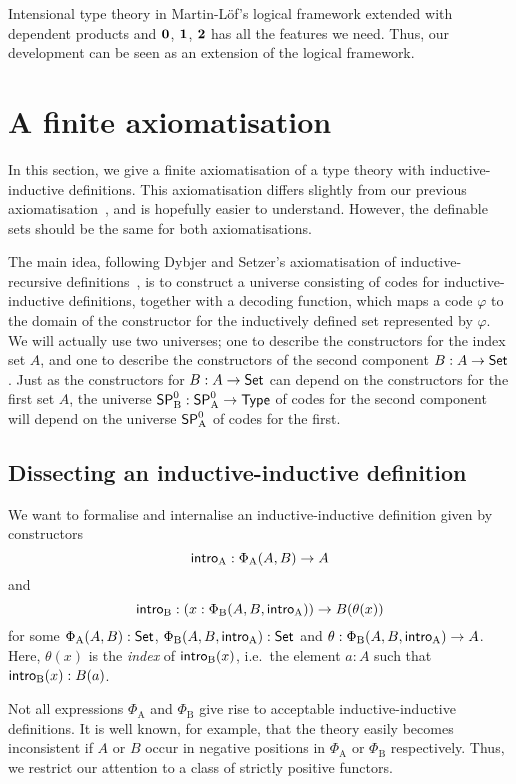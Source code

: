 \documentclass{schwicht}
\begin{document}
Intensional type theory in Martin-L\"of's logical framework extended with
dependent products and $\mathbf{0}$, $\mathbf{1}$, $\mathbf{2}$
 has all the features we
need. Thus, our development can be seen as an extension of
the logical framework.

\section{A finite axiomatisation}
\label{sec:axiomatisation}
 

In this section, we give a finite axiomatisation of a type theory with
inductive-inductive definitions. This axiomatisation differs slightly
from our previous
axiomatisation~\cite{nordvallforsbergSetzer2010indind}, and is
hopefully easier to understand. However, the definable sets should
be the same for both axiomatisations.

The main idea, following Dybjer and Setzer's axiomatisation of
inductive-recursive definitions~\cite{dybjersetzer1999finax}, is to
construct a universe consisting of codes for inductive-inductive
definitions, together with a decoding function, which maps a code
$\varphi$ to the domain of the constructor for the inductively defined
set represented by $\varphi$.  We will actually use two universes; one
to describe the constructors for the index set $A$, and one to
describe the constructors of the second component $B : A \to \mathsf{Set}$.
Just as the constructors for $B : A \to \mathsf{Set}$ can depend on the
constructors for the first set $A$, the universe $\mathsf{SP}^{0}_{\mathrm{B}} : \mathsf{SP}^{0}_{\mathrm{A}} \to
\mathsf{Type}$ of codes for the second component will depend on the universe
$\mathsf{SP}^{0}_{\mathrm{A}}$ of codes for the first.

\subsection{Dissecting an inductive-inductive definition}
\label{sec:dissect-ind}

We want to formalise and internalise an inductive-inductive definition
given by constructors
\[
\mathsf{intro}_{\mathrm{A}} : \Phi_{\mathrm{A}}(A, B) \to A
\]
and
\[
\mathsf{intro}_{\mathrm{B}} : (x : \Phi_{\mathrm{B}}(A, B, \mathsf{intro}_{\mathrm{A}})) \to B(\theta(x))
\]
for some $\Phi_{\mathrm{A}}(A, B) : \mathsf{Set}$, $\Phi_{\mathrm{B}}(A, B,
\mathsf{intro}_{\mathrm{A}}) : \mathsf{Set}$ and $\theta : \Phi_{\mathrm{B}}(A, B, \mathsf{intro}_{\mathrm{A}}) \to
A$.
Here, $\theta(x)$ is the \emph{index} of $\mathsf{intro}_{\mathrm{B}}(x)$, i.e.\ the element $a :
A$ such that $\mathsf{intro}_{\mathrm{B}}(x) : B(a)$.

Not all expressions $\Phi_{\mathrm{A}}$ and $\Phi_{\mathrm{B}}$ give
rise to acceptable inductive-inductive definitions. It is well known,
for example, that the theory easily becomes inconsistent if $A$ or $B$ occur
in negative positions in $\Phi_{\mathrm{A}}$ or $\Phi_{\mathrm{B}}$
respectively. Thus, we restrict our attention to a class of strictly
positive functors.
\end{document}
